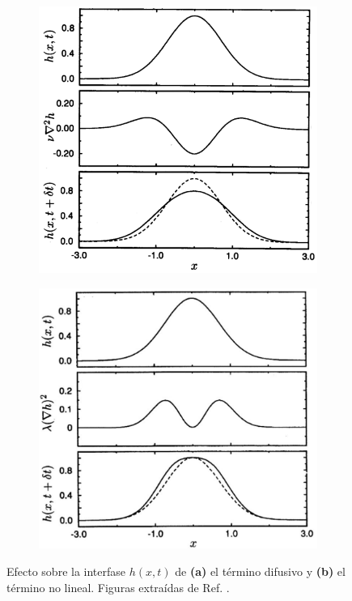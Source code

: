 \begin{figure}[!t]
    \hspace*{-1cm}
    \begin{subfigure}{.55\textwidth}
      \centering
      \includegraphics[width=\textwidth]{diffusive_term.png}
      \caption{}
    \end{subfigure}
    \begin{subfigure}{.55\textwidth}
      \centering
      \includegraphics[width=\textwidth]{non_linear_term.png}
      \caption{}
    \end{subfigure}
    \caption[Término difusivo y no lineal de la ecuación de KPZ.]{Efecto sobre la interfase $h(x,t)$ de \textbf{(a)} el término difusivo y \textbf{(b)} el término no lineal. Figuras extraídas de Ref. \cite{barabasi}.}
    \label{fig:KPZ}
\end{figure}

